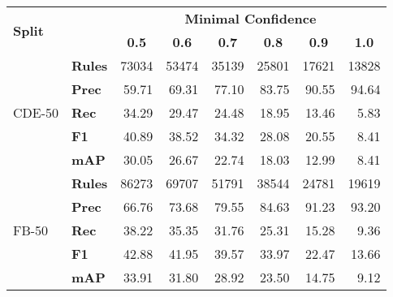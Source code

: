 \begin{tabular}{| l | l | r | r | r | r | r | r |}
    \hline

    \multirow{2}{*}{\textbf{Split}} &
    &
    \multicolumn{6}{|c|}{\textbf{Minimal Confidence}} \\

    &
    &
    \multicolumn{1}{|c|}{\textbf{0.5}} &
    \multicolumn{1}{|c|}{\textbf{0.6}} &
    \multicolumn{1}{|c|}{\textbf{0.7}} &
    \multicolumn{1}{|c|}{\textbf{0.8}} &
    \multicolumn{1}{|c|}{\textbf{0.9}} &
    \multicolumn{1}{|c|}{\textbf{1.0}} \\

    \hline \hline

    \multirow{5}{*}{CDE-50}
    & \textbf{Rules} & \num{73034} & \num{53474} & \num{35139} & \num{25801} & \num{17621} & \num{13828} \\ \cline{2-8}
    & \textbf{Prec}  & 59.71       & 69.31       & 77.10       & 83.75       & 90.55       & 94.64       \\
    & \textbf{Rec}   & 34.29       & 29.47       & 24.48       & 18.95       & 13.46       & 5.83        \\
    & \textbf{F1}    & 40.89       & 38.52       & 34.32       & 28.08       & 20.55       & 8.41        \\
    & \textbf{mAP}   & 30.05       & 26.67       & 22.74       & 18.03       & 12.99       & 8.41        \\ \hline \hline

    \multirow{5}{*}{FB-50}
    & \textbf{Rules} & \num{86273} & \num{69707} & \num{51791} & \num{38544} & \num{24781} & \num{19619} \\ \cline{2-8}
    & \textbf{Prec}  & 66.76       & 73.68       & 79.55       & 84.63       & 91.23       & 93.20       \\
    & \textbf{Rec}   & 38.22       & 35.35       & 31.76       & 25.31       & 15.28       & 9.36        \\
    & \textbf{F1}    & 42.88       & 41.95       & 39.57       & 33.97       & 22.47       & 13.66       \\
    & \textbf{mAP}   & 33.91       & 31.80       & 28.92       & 23.50       & 14.75       & 9.12        \\ \hline

\end{tabular}
